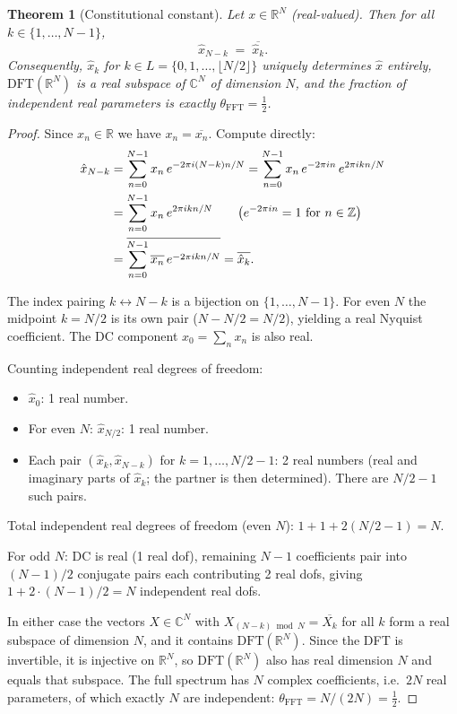 \documentclass[12pt]{article}
\newtheorem{theorem}{Theorem}[section]
\theoremstyle{definition}
\newcommand{\Z}{\mathbb{Z}}
\newcommand{\R}{\mathbb{R}}
\newcommand{\C}{\mathbb{C}}
\newcommand{\thetaFFT}{\theta_{\mathrm{FFT}}}
\newcommand{\DFT}{\mathrm{DFT}}
\begin{document}
\begin{theorem}[Constitutional constant]\label{thm:main}
Let $x \in \R^N$ (real-valued).  Then for all $k \in \{1, \ldots, N-1\}$,
\[
  \hat{x}_{N-k} \;=\; \overline{\hat{x}_k}.
\]
Consequently, $\hat{x}_k$ for $k \in L = \{0, 1, \ldots, \lfloor N/2 \rfloor\}$
uniquely determines $\hat{x}$ entirely, $\DFT(\R^N)$ is a real subspace
of $\C^N$ of dimension $N$, and the fraction of independent real
parameters is exactly $\thetaFFT = \tfrac{1}{2}$.
\end{theorem}

\begin{proof}
Since $x_n \in \R$ we have $x_n = \overline{x_n}$.  Compute directly:
\begin{align}
  \hat{x}_{N-k}
    &= \sum_{n=0}^{N-1} x_n \, e^{-2\pi i (N-k) n / N}
     = \sum_{n=0}^{N-1} x_n \, e^{-2\pi i n} \, e^{2\pi i k n / N} \notag\\
    &= \sum_{n=0}^{N-1} x_n \, e^{2\pi i k n / N}
     \qquad\bigl(e^{-2\pi i n} = 1 \text{ for } n \in \Z\bigr) \notag\\
    &= \overline{\sum_{n=0}^{N-1} \overline{x_n} \, e^{-2\pi i k n / N}}
     = \overline{\hat{x}_k}.  \label{eq:conjugate}
\end{align}

The index pairing $k \leftrightarrow N-k$ is a bijection on
$\{1, \ldots, N-1\}$.  For even $N$ the midpoint $k = N/2$ is its
own pair ($N - N/2 = N/2$), yielding a real Nyquist coefficient.
The DC component $\hat{x}_0 = \sum_n x_n$ is also real.

Counting independent real degrees of freedom:
\begin{itemize}[noitemsep]
  \item $\hat{x}_0$: 1 real number.
  \item For even $N$: $\hat{x}_{N/2}$: 1 real number.
  \item Each pair $(\hat{x}_k, \hat{x}_{N-k})$ for
        $k = 1, \ldots, N/2 - 1$: 2 real numbers (real and imaginary
        parts of $\hat{x}_k$; the partner is then determined).
        There are $N/2 - 1$ such pairs.
\end{itemize}
Total independent real degrees of freedom (even $N$):
$1 + 1 + 2(N/2 - 1) = N$.

For odd $N$: DC is real (1 real dof), remaining $N-1$ coefficients
pair into $(N-1)/2$ conjugate pairs each contributing 2 real dofs,
giving $1 + 2 \cdot (N-1)/2 = N$ independent real dofs.

In either case the vectors $X \in \C^N$ with
$X_{(N-k) \bmod N} = \overline{X_k}$ for all $k$ form a real subspace of
dimension $N$, and it contains $\DFT(\R^N)$.  Since the DFT is
invertible, it is injective on $\R^N$, so $\DFT(\R^N)$ also has real
dimension $N$ and equals that subspace.  The full spectrum has $N$
complex coefficients, i.e.\ $2N$ real parameters, of which exactly $N$
are independent: $\thetaFFT = N / (2N) = \tfrac{1}{2}$.
\end{proof}
\end{document}
